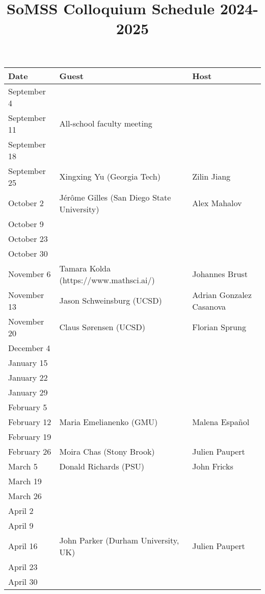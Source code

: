 \documentclass[11pt]{article}
\begin{document}
\title{SoMSS Colloquium Schedule 2024-2025}
\author{}
\date{}
\maketitle



\begin{table}[htp]
\begin{center}
\begin{tabular}{|l|l|l|}
\hline
Date & Guest & Host\\
\hline
September 4 & & \\
September 11 & All-school faculty meeting & \\
September 18 & & \\
September 25 & Xingxing Yu (Georgia Tech) & Zilin Jiang\\
October 2 &J\'er\^ome Gilles (San Diego State University)& Alex Mahalov \\
October 9 & & \\
October 23 & & \\
October 30 & & \\
November 6 & Tamara Kolda (https://www.mathsci.ai/) & Johannes Brust\\
November 13 & Jason Schweinsburg (UCSD) & Adrian Gonzalez Casanova\\
November 20 &Claus S\o rensen (UCSD) & Florian Sprung \\
December 4 & & \\
January 15 & & \\
January 22 & & \\
January 29 & & \\
February 5 & & \\
February 12 & Maria Emelianenko (GMU) & Malena Espa\~nol\\
February 19 & & \\
February 26  & Moira Chas (Stony Brook) & Julien Paupert \\
March 5 & Donald Richards (PSU) & John Fricks \\
March 19 & & \\
March 26 & & \\
April 2 & & \\
April 9 & & \\
April 16 & John Parker (Durham University, UK)& Julien Paupert \\
April 23 & & \\
April 30 & & \\
\hline
\end{tabular}
\end{center}
\label{default}
\end{table}%
\end{document}
